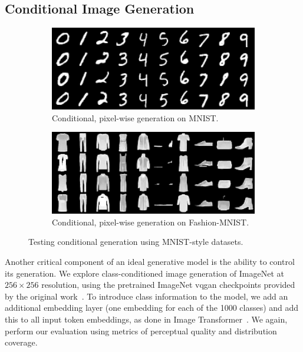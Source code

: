 \subsection{Conditional Image Generation}

\begin{figure}[ht]
    \centering
    \begin{subfigure}[b]{0.47\textwidth}
        \centering
        \includegraphics[width=1.0\textwidth]{figures/mnist-samples.png}
        \caption{
            Conditional, pixel-wise generation on MNIST.
        }
    \end{subfigure}
    \hfill
    \begin{subfigure}[b]{0.47\textwidth}
        \centering
        \includegraphics[width=1.0\textwidth]{figures/fashionmnist-samples.png}
        \caption{
            Conditional, pixel-wise generation on Fashion-MNIST.
        }
    \end{subfigure}
    \caption{Testing conditional generation using MNIST-style datasets.}
\end{figure}

Another critical component of an ideal generative model is the ability to
control its generation. We explore class-conditioned image generation of
ImageNet at $256 \times 256$ resolution, using the pretrained ImageNet
\gls{vqgan} checkpoints provided by the original work~\cite{esser2021taming}. To
introduce class information to the model, we add an additional embedding layer
(one embedding for each of the 1000 classes) and add this to all input token
embeddings, as done in Image Transformer~\cite{parmar2018image}. We again,
perform our evaluation using metrics of perceptual quality and distribution
coverage.

